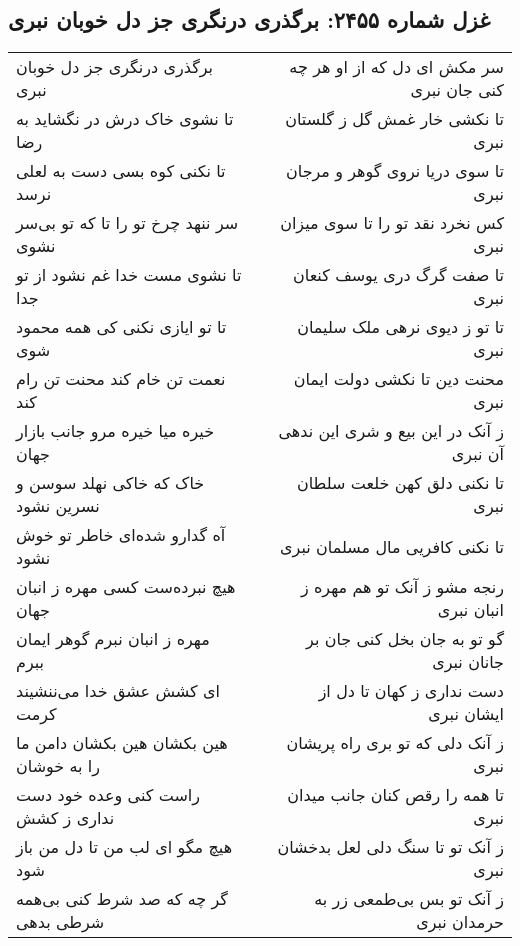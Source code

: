 \begin{center}
\section*{غزل شماره ۲۴۵۵: برگذری درنگری جز دل خوبان نبری}
\label{sec:2455}
\begin{longtable}{l p{0.5cm} r}
برگذری درنگری جز دل خوبان نبری
&&
سر مکش ای دل که از او هر چه کنی جان نبری
\\
تا نشوی خاک درش در نگشاید به رضا
&&
تا نکشی خار غمش گل ز گلستان نبری
\\
تا نکنی کوه بسی دست به لعلی نرسد
&&
تا سوی دریا نروی گوهر و مرجان نبری
\\
سر ننهد چرخ تو را تا که تو بی‌سر نشوی
&&
کس نخرد نقد تو را تا سوی میزان نبری
\\
تا نشوی مست خدا غم نشود از تو جدا
&&
تا صفت گرگ دری یوسف کنعان نبری
\\
تا تو ایازی نکنی کی همه محمود شوی
&&
تا تو ز دیوی نرهی ملک سلیمان نبری
\\
نعمت تن خام کند محنت تن رام کند
&&
محنت دین تا نکشی دولت ایمان نبری
\\
خیره میا خیره مرو جانب بازار جهان
&&
ز آنک در این بیع و شری این ندهی آن نبری
\\
خاک که خاکی نهلد سوسن و نسرین نشود
&&
تا نکنی دلق کهن خلعت سلطان نبری
\\
آه گدارو شده‌ای خاطر تو خوش نشود
&&
تا نکنی کافریی مال مسلمان نبری
\\
هیچ نبرده‌ست کسی مهره ز انبان جهان
&&
رنجه مشو ز آنک تو هم مهره ز انبان نبری
\\
مهره ز انبان نبرم گوهر ایمان ببرم
&&
گو تو به جان بخل کنی جان بر جانان نبری
\\
ای کشش عشق خدا می‌ننشیند کرمت
&&
دست نداری ز کهان تا دل از ایشان نبری
\\
هین بکشان هین بکشان دامن ما را به خوشان
&&
ز آنک دلی که تو بری راه پریشان نبری
\\
راست کنی وعده خود دست نداری ز کشش
&&
تا همه را رقص کنان جانب میدان نبری
\\
هیچ مگو ای لب من تا دل من باز شود
&&
ز آنک تو تا سنگ دلی لعل بدخشان نبری
\\
گر چه که صد شرط کنی بی‌همه شرطی بدهی
&&
ز آنک تو بس بی‌طمعی زر به حرمدان نبری
\\
\end{longtable}
\end{center}

